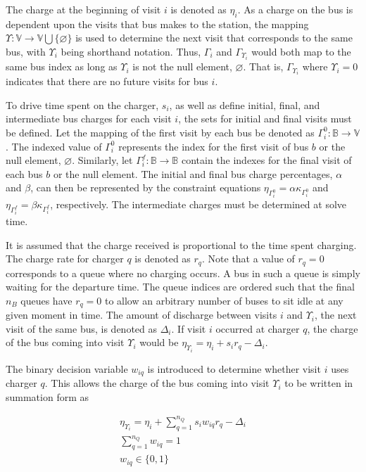 \documentclass[ee,msthesis]{usuthesis}
\begin{document}
The charge at the beginning of visit \(i\) is denoted as \(\eta_i\). As a charge on the bus is dependent upon the visits that
bus makes to the station, the mapping \(\Upsilon: \mathbb{V} \rightarrow \mathbb{V} \bigcup \{\varnothing\}\) is used to determine the next visit
that corresponds to the same bus, with \(\Upsilon_i\) being shorthand notation. Thus, \(\Gamma_i\) and \(\Gamma_{\Upsilon_i}\) would both map to the
same bus index as long as \(\Upsilon_i\) is not the null element, \(\varnothing\). That is, \(\Gamma_{\Upsilon_i}\) where \(\Upsilon_i = 0\) indicates
that there are no future visits for bus \(i\).

To drive time spent on the charger, \(s_i\), as well as define initial, final, and intermediate bus charges for each visit
\(i\), the sets for initial and final visits must be defined. Let the mapping of the first visit by each bus be denoted as
\(\Gamma^0_i : \mathbb{B} \rightarrow \mathbb{V}\). The indexed value of \(\Gamma^0_i\) represents the index for the first visit of bus \(b\) or
the null element, \(\varnothing\). Similarly, let \(\Gamma^f_i : \mathbb{B} \rightarrow \mathbb{B}\) contain the indexes for the final
visit of each bus \(b\) or the null element. The initial and final bus charge percentages, \(\alpha\) and \(\beta\), can then be
represented by the constraint equations \(\eta_{\Gamma^0_i} = \alpha \kappa_{\Gamma^0_i}\) and \(\eta_{\Gamma^f_i} = \beta \kappa_{\Gamma^f_i}\), respectively. The
intermediate charges must be determined at solve time.

It is assumed that the charge received is proportional to the time spent charging. The charge rate for charger \(q\) is
denoted as \(r_q\). Note that a value of \(r_q = 0\) corresponds to a queue where no charging occurs. A bus in such a queue
is simply waiting for the departure time. The queue indices are ordered such that the final \(n_B\) queues have \(r_q = 0\)
to allow an arbitrary number of buses to sit idle at any given moment in time. The amount of discharge between visits
\(i\) and \(\Upsilon_i\), the next visit of the same bus, is denoted as \(\Delta_i\). If visit \(i\) occurred at charger \(q\), the charge of
the bus coming into visit \(\Upsilon_i\) would be \(\eta_{\Upsilon_i} = \eta_i + s_i r_q - \Delta_i\).

The binary decision variable \(w_{iq}\) is introduced to determine whether visit \(i\) uses charger \(q\). This allows the
charge of the bus coming into visit \(\Upsilon_i\) to be written in summation form as

\begin{subequations}
    \label{subeq:pre_next_charge}
\begin{align}
    \eta_{\Upsilon_i} = \eta_i + \sum_{q=1}^{n_Q} s_i w_{iq} r_q - \Delta_i  \\
    \sum_{q=1}^{n_Q} w_{iq} = 1 \\
    w_{iq} \in \{0,1\}
\end{align}
\end{subequations}
\end{document}
